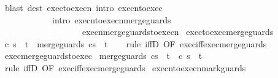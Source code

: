 \begin{isabellebody}
\isamarkupfalse%
\ {\isacharparenleft}blast\ dest{\isacharcolon}\ exec{\isacharunderscore}to{\isacharunderscore}execn\ intro{\isacharcolon}\ execn{\isacharunderscore}to{\isacharunderscore}exec\isanewline
\ \ \ \ \ \ \ \ \ \ \ \ intro{\isacharcolon}\ execn{\isacharunderscore}to{\isacharunderscore}execn{\isacharunderscore}merge{\isacharunderscore}guards\isanewline
\ \ \ \ \ \ \ \ \ \ \ \ \ \ \ \ \ \ \ execn{\isacharunderscore}merge{\isacharunderscore}guards{\isacharunderscore}to{\isacharunderscore}execn{\isacharparenright}%
\endisatagproof
{\isafoldproof}%
%
\isadelimproof
\isanewline
%
\endisadelimproof
\isanewline
{}\isamarkupfalse%
\ exec{\isacharunderscore}to{\isacharunderscore}exec{\isacharunderscore}merge{\isacharunderscore}guards{\isacharcolon}\isanewline
\ {\isachardoublequoteopen}{\isasymGamma}{\isasymturnstile}{\isasymlangle}c{\isacharcomma}\ s{\isasymrangle}\ {\isasymRightarrow}\ t\ {\isasymLongrightarrow}\ {\isasymGamma}{\isasymturnstile}{\isasymlangle}merge{\isacharunderscore}guards\ c{\isacharcomma}s{\isasymrangle}\ {\isasymRightarrow}\ t{\isachardoublequoteclose}\isanewline
%
\isadelimproof
\ \ %
\endisadelimproof
%
\isatagproof
{}\isamarkupfalse%
\ {\isacharparenleft}rule\ iffD{}\ {\isacharbrackleft}OF\ exec{\isacharunderscore}iff{\isacharunderscore}exec{\isacharunderscore}merge{\isacharunderscore}guards{\isacharbrackright}{\isacharparenright}%
\endisatagproof
{\isafoldproof}%
%
\isadelimproof
\isanewline
%
\endisadelimproof
\isanewline
{}\isamarkupfalse%
\ exec{\isacharunderscore}merge{\isacharunderscore}guards{\isacharunderscore}to{\isacharunderscore}exec{\isacharcolon}\isanewline
\ {\isachardoublequoteopen}{\isasymGamma}{\isasymturnstile}{\isasymlangle}merge{\isacharunderscore}guards\ c{\isacharcomma}s{\isasymrangle}\ {\isasymRightarrow}\ t\ {\isasymLongrightarrow}\ {\isasymGamma}{\isasymturnstile}{\isasymlangle}c{\isacharcomma}\ s{\isasymrangle}\ {\isasymRightarrow}\ t{\isachardoublequoteclose}\isanewline
%
\isadelimproof
\ \ %
\endisadelimproof
%
\isatagproof
{}\isamarkupfalse%
\ {\isacharparenleft}rule\ iffD{}\ {\isacharbrackleft}OF\ exec{\isacharunderscore}iff{\isacharunderscore}exec{\isacharunderscore}merge{\isacharunderscore}guards{\isacharbrackright}{\isacharparenright}%
\endisatagproof
{\isafoldproof}%
%
\isadelimproof
%
\endisadelimproof
%
\isamarkuptrue%
\isamarkupfalse%
\ execn{\isacharunderscore}to{\isacharunderscore}execn{\isacharunderscore}mark{\isacharunderscore}guards{\isacharcolon}\isanewline

\end{isabellebody}
